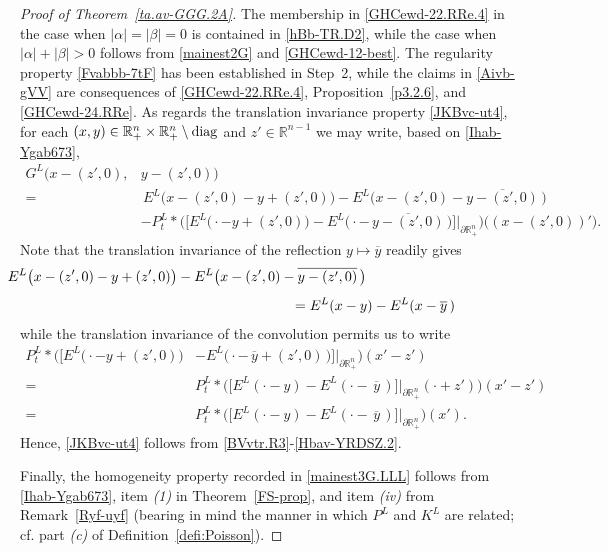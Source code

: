 \documentclass[11pt,reqno]{amsart}
\numberwithin{equation}{section}
\theoremstyle{remark}
\begin{document}
\begin{proof}[Proof of Theorem~\ref{ta.av-GGG.2A}]
The membership in \eqref{GHCewd-22.RRe.4} in the case when $|\alpha|=|\beta|=0$ 
is contained in \eqref{hBb-TR.D2}, while the case when $|\alpha|+|\beta|>0$
follows from \eqref{mainest2G} and \eqref{GHCewd-12-best}.
The regularity property \eqref{Fvabbb-7tF} has been established in Step~2,
while the claims in \eqref{Aivb-gVV} are consequences of \eqref{GHCewd-22.RRe.4},
Proposition~\ref{p3.2.6}, and \eqref{GHCewd-24.RRe}.
As regards the translation invariance property \eqref{JKBvc-ut4}, for each 
$(x,y)\in{\mathbb{R}}^n_{+}\times{\mathbb{R}}^n_{+}\setminus{\rm diag}$ 
and $z'\in{\mathbb{R}}^{n-1}$ we may write, based on \eqref{Ihab-Ygab673}, 
%
\begin{align}\label{BVvtr.R3}
G^L\big(x-(z',0), & y-(z',0)\big)
\\[4pt]
= & \,E^L\big(x-(z',0)-y+(z',0)\big)
-E^L\big(x-(z',0)-\overline{y-(z',0)}\,\big)
\nonumber\\[4pt]
& -P^L_t\ast\Big(\big[E^L\big(\cdot-y+(z',0)\big)
-E^L\big(\cdot-\,\overline{y-(z',0)}\,\big)\big]
\big|_{\partial{\mathbb{R}}^n_{+}}\Big)\big((x-(z',0))'\big).
\nonumber
\end{align}
%
Note that the translation invariance of the reflection $y\mapsto\overline{y}$ 
readily gives
%
\begin{align}\label{Hbav-YRDSZ}
&\hskip -0.80in
E^L\big(x-(z',0)-y+(z',0)\big)-E^L\big(x-(z',0)-\overline{y-(z',0)}\,\big)
\nonumber\\[4pt]
&\hskip 2.00in
=E^L(x-y)-E^L(x-\overline{y}\,)
\end{align}
%
while the translation invariance of the convolution permits us to write 
%
\begin{align}\label{Hbav-YRDSZ.2}
P^L_t\ast\Big(\big[E^L\big(\cdot-y+(z',0)\big)
& -E^L\big(\cdot-\,\overline{y}+(z',0)\,\big)\big]
\big|_{\partial{\mathbb{R}}^n_{+}}\Big)(x'-z')
\nonumber\\[4pt]
= & P^L_t\ast\Big(\big[E^L(\cdot-y)-E^L(\cdot-\,\overline{y}\,)\big]
\big|_{\partial{\mathbb{R}}^n_{+}}(\cdot+z')\Big)(x'-z')
\nonumber\\[4pt]
= & P^L_t\ast\Big(\big[E^L(\cdot-y)-E^L(\cdot-\,\overline{y}\,)\big]
\big|_{\partial{\mathbb{R}}^n_{+}}\Big)(x').
\end{align}
%
Hence, \eqref{JKBvc-ut4} follows from \eqref{BVvtr.R3}-\eqref{Hbav-YRDSZ.2}.

Finally, the homogeneity property recorded in \eqref{mainest3G.LLL} follows from \eqref{Ihab-Ygab673}, 
item {\it (1)} in Theorem~\ref{FS-prop}, and item {\it (iv)} from Remark~\ref{Ryf-uyf} 
(bearing in mind the manner in which $P^L$ and $K^L$ are related; 
cf. part {\it (c)} of Definition~\ref{defi:Poisson}).  


\end{proof}
\end{document}
